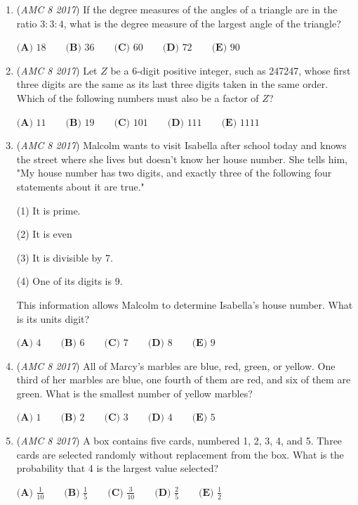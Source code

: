 \begin{enumerate}
	\item (\textit{AMC 8 2017}) If the degree measures of the angles of a triangle are in the ratio $3:3:4$, what is the degree measure of the largest angle of the triangle?


 $\textbf{(A) }18\qquad\textbf{(B) }36\qquad\textbf{(C) }60\qquad\textbf{(D) }72\qquad\textbf{(E) }90$


	\item (\textit{AMC 8 2017}) Let $Z$ be a 6-digit positive integer, such as 247247, whose first three digits are the same as its last three digits taken in the same order. Which of the following numbers must also be a factor of $Z$?


 $\textbf{(A) }11\qquad\textbf{(B) }19\qquad\textbf{(C) }101\qquad\textbf{(D) }111\qquad\textbf{(E) }1111$


	\item (\textit{AMC 8 2017}) Malcolm wants to visit Isabella after school today and knows the street where she lives but doesn't know her house number. She tells him, "My house number has two digits, and exactly three of the following four statements about it are true."


 (1) It is prime.


 (2) It is even


 (3) It is divisible by 7.


 (4) One of its digits is 9.


 This information allows Malcolm to determine Isabella's house number. What is its units digit?


 $\textbf{(A) }4\qquad\textbf{(B) }6\qquad\textbf{(C) }7\qquad\textbf{(D) }8\qquad\textbf{(E) }9$


	\item (\textit{AMC 8 2017}) All of Marcy's marbles are blue, red, green, or yellow. One third of her marbles are blue, one fourth of them are red, and six of them are green. What is the smallest number of yellow marbles?


 $\textbf{(A) }1\qquad\textbf{(B) }2\qquad\textbf{(C) }3\qquad\textbf{(D) }4\qquad\textbf{(E) }5$


	\item (\textit{AMC 8 2017}) A box contains five cards, numbered 1, 2, 3, 4, and 5. Three cards are selected randomly without replacement from the box. What is the probability that 4 is the largest value selected?


 $\textbf{(A) }\frac{1}{10}\qquad\textbf{(B) }\frac{1}{5}\qquad\textbf{(C) }\frac{3}{10}\qquad\textbf{(D) }\frac{2}{5}\qquad\textbf{(E) }\frac{1}{2}$



\end{enumerate}
